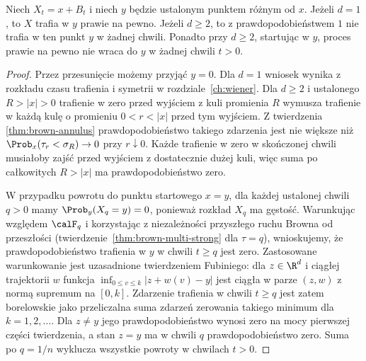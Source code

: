 \begin{twierdzenie}
Niech $X_t=x+B_t$ i niech $y$ będzie ustalonym
punktem różnym od $x$.
Jeżeli $d=1$, to $X$ trafia w $y$ prawie na pewno.
Jeżeli $d\ge2$, to z prawdopodobieństwem $1$
nie trafia w ten punkt $y$ w żadnej chwili.
Ponadto przy $d\ge2$, startując w $y$, proces
prawie na pewno nie wraca do $y$ w żadnej chwili $t>0$.
\end{twierdzenie}
\begin{proof}
Przez przesunięcie możemy przyjąć $y=0$.
Dla $d=1$ wniosek wynika z rozkładu czasu
trafienia i symetrii w rozdziale~\ref{ch:wiener}.
Dla $d\ge2$ i ustalonego $R>|x|>0$
trafienie w zero przed wyjściem z kuli promienia $R$
wymusza trafienie w każdą kulę o promieniu
$0<r<|x|$ przed tym wyjściem. Z twierdzenia
\ref{thm:brown-annulus} prawdopodobieństwo
takiego zdarzenia jest nie większe niż
$\Prob_x(\tau_r<\sigma_R)\to0$ przy $r\downarrow0$.
Każde trafienie w zero w skończonej chwili
musiałoby zajść przed wyjściem z dostatecznie
dużej kuli, więc suma po całkowitych $R>|x|$
ma prawdopodobieństwo zero.

W przypadku powrotu do punktu startowego $x=y$,
dla każdej ustalonej chwili $q>0$
mamy $\Prob_y(X_q=y)=0$, ponieważ rozkład $X_q$
ma gęstość. Warunkując względem $\calF_q$ i
korzystając z niezależności przyszłego ruchu Browna
od przeszłości (twierdzenie~\ref{thm:brown-multi-strong}
dla $\tau=q$), wnioskujemy, że prawdopodobieństwo
trafienia w $y$ w chwili $t\ge q$ jest zero.
Zastosowane warunkowanie jest uzasadnione twierdzeniem
Fubiniego: dla $z\in\R^d$ i ciągłej trajektorii $w$
funkcja $\inf_{0\le v\le k}|z+w(v)-y|$ jest ciągła
w parze $(z,w)$ z normą supremum na $[0,k]$.
Zdarzenie trafienia w chwili $t\ge q$ jest zatem
borelowskie jako przeliczalna suma zdarzeń
zerowania takiego minimum dla $k=1,2,\ldots$.
Dla $z\ne y$ jego prawdopodobieństwo wynosi zero
na mocy pierwszej części twierdzenia, a stan $z=y$
ma w chwili $q$ prawdopodobieństwo zero. Suma po
$q=1/n$ wyklucza wszystkie powroty w chwilach $t>0$.
\end{proof}

